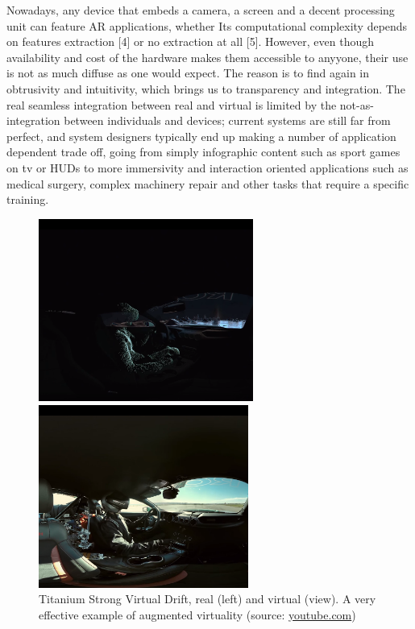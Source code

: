 Nowadays, any device that embeds a camera, a screen and a decent processing unit can feature AR applications, whether Its computational complexity depends on features extraction [4] or no extraction at all [5]. However, even though availability and cost of the hardware makes them accessible to anyyone, their use is not as much diffuse as one would expect. The reason is to find again in obtrusivity and intuitivity, which brings us to transparency and integration. The real seamless integration between real and virtual is limited by the not-as-integration between individuals and devices; current systems are still far from perfect, and system designers typically end up making a number of application dependent trade off, going from simply infographic content such as sport games on tv or HUDs to more immersivity and interaction oriented applications such as medical surgery, complex machinery repair and other tasks that require a specific training.

\begin{figure}
\centering
\begin{subfigure}    
\begin{minipage}[t]{0.49\textwidth}
\includegraphics[width=\linewidth, height=6cm]{pictures/titanium-a}
\end{minipage}
\hspace{\fill}
\begin{minipage}[t]{0.49\textwidth}
\includegraphics[width=\linewidth, height=6cm]{pictures/titanium-b}
\end{minipage}
\end{subfigure}
\vspace*{-6mm}
\caption{Titanium Strong Virtual Drift, real (left) and virtual (view). A very effective example of augmented virtuality (source: \href{https://www.youtube.com/watch?v=WJyG76Izk8M}{youtube.com})}
\end{figure}

